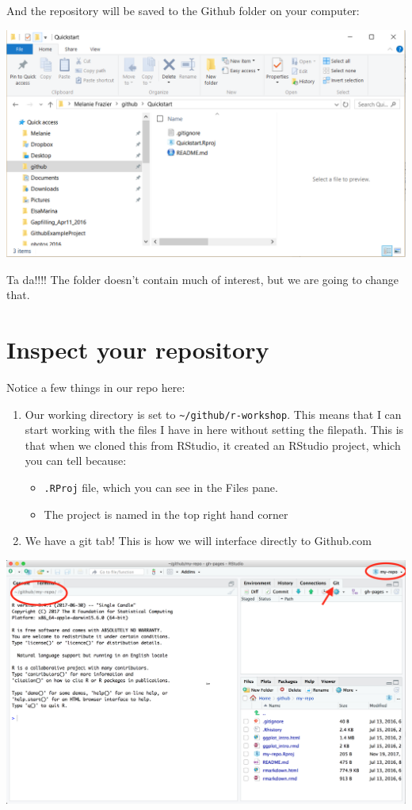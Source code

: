 \documentclass[]{book}
\providecommand{\tightlist}{%
  \setlength{\itemsep}{0pt}\setlength{\parskip}{0pt}}
\begin{document}
And the repository will be saved to the Github folder on your computer:

\includegraphics{img/cloned_repository.png}

Ta da!!!! The folder doesn't contain much of interest, but we are going to change that.

\hypertarget{inspect-your-repository}{%
\section{Inspect your repository}\label{inspect-your-repository}}

Notice a few things in our repo here:

\begin{enumerate}
\def\labelenumi{\arabic{enumi}.}
\tightlist
\item
  Our working directory is set to \texttt{\textasciitilde{}/github/r-workshop}. This means that I can start working with the files I have in here without setting the filepath. This is that when we cloned this from RStudio, it created an RStudio project, which you can tell because:

  \begin{itemize}
  \tightlist
  \item
    \texttt{.RProj} file, which you can see in the Files pane.
  \item
    The project is named in the top right hand corner
  \end{itemize}
\item
  We have a git tab! This is how we will interface directly to Github.com
\end{enumerate}

\includegraphics{img/RStudio_IDE_git.png}
\end{document}
